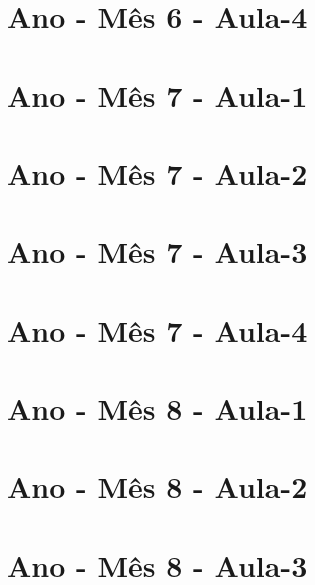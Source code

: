 \begin{multicols}{2}
\section[\sffamily 5\textordmasculine\space Ano - Mês 6 - Aula-4]{\textordmasculine\space Ano - Mês 6 - Aula-4}


\section[\sffamily 5\textordmasculine\space Ano - Mês 7 - Aula-1]{\textordmasculine\space Ano - Mês 7 - Aula-1}


\section[\sffamily 5\textordmasculine\space Ano - Mês 7 - Aula-2]{\textordmasculine\space Ano - Mês 7 - Aula-2}


\section[\sffamily 5\textordmasculine\space Ano - Mês 7 - Aula-3]{\textordmasculine\space Ano - Mês 7 - Aula-3}


\section[\sffamily 5\textordmasculine\space Ano - Mês 7 - Aula-4]{\textordmasculine\space Ano - Mês 7 - Aula-4}


\section[\sffamily 5\textordmasculine\space Ano - Mês 8 - Aula-1]{\textordmasculine\space Ano - Mês 8 - Aula-1}


\section[\sffamily 5\textordmasculine\space Ano - Mês 8 - Aula-2]{\textordmasculine\space Ano - Mês 8 - Aula-2}


\section[\sffamily 5\textordmasculine\space Ano - Mês 8 - Aula-3]{\textordmasculine\space Ano - Mês 8 - Aula-3}



\end{multicols}
